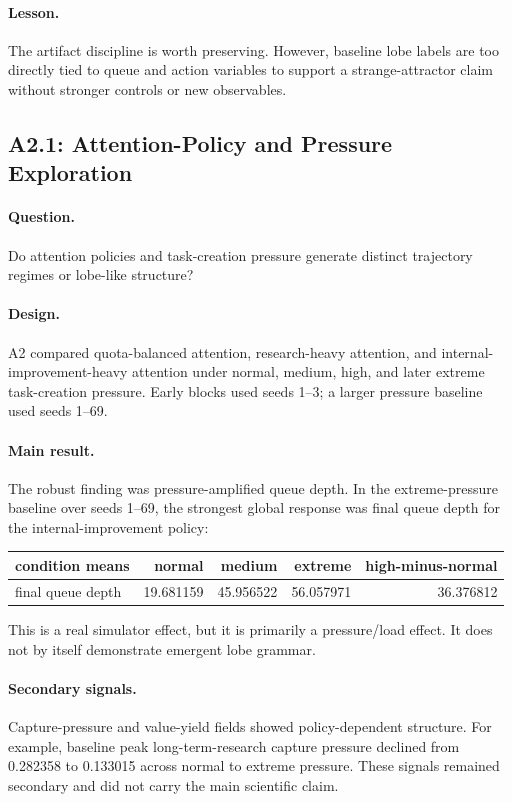 \documentclass[11pt]{article}
\begin{document}
\paragraph{Lesson.}
The artifact discipline is worth preserving. However, baseline lobe labels are
too directly tied to queue and action variables to support a strange-attractor
claim without stronger controls or new observables.

\subsection{A2.1: Attention-Policy and Pressure Exploration}

\paragraph{Question.}
Do attention policies and task-creation pressure generate distinct trajectory
regimes or lobe-like structure?

\paragraph{Design.}
A2 compared quota-balanced attention, research-heavy attention, and
internal-improvement-heavy attention under normal, medium, high, and later
extreme task-creation pressure. Early blocks used seeds 1--3; a larger pressure
baseline used seeds 1--69.

\paragraph{Main result.}
The robust finding was pressure-amplified queue depth. In the extreme-pressure
baseline over seeds 1--69, the strongest global response was final queue depth
for the internal-improvement policy:

\begin{center}
\begin{tabular}{lrrrr}
condition means & normal & medium & extreme & high-minus-normal \\
\hline
final queue depth & 19.681159 & 45.956522 & 56.057971 & 36.376812
\end{tabular}
\end{center}

This is a real simulator effect, but it is primarily a pressure/load effect. It
does not by itself demonstrate emergent lobe grammar.

\paragraph{Secondary signals.}
Capture-pressure and value-yield fields showed policy-dependent structure. For
example, baseline peak long-term-research capture pressure declined from
0.282358 to 0.133015 across normal to extreme pressure. These signals remained
secondary and did not carry the main scientific claim.
\end{document}
